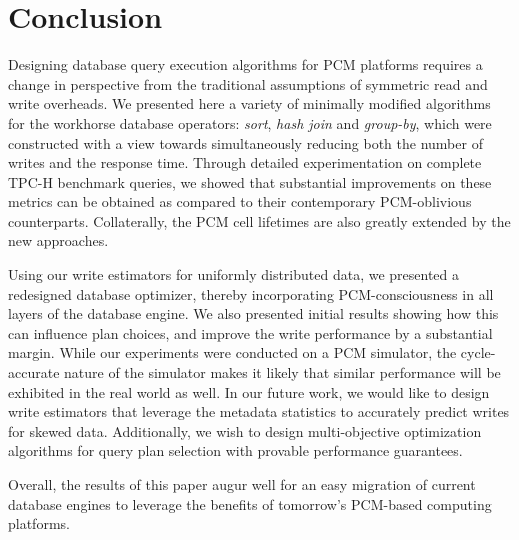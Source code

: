 \section{Conclusion}
\label{conclusion}
Designing database query execution algorithms for PCM platforms requires a
change in perspective from the traditional assumptions of symmetric read
and write overheads.  We presented here a variety of minimally modified algorithms
for the workhorse database operators: \emph{sort}, \emph{hash join} and
\emph{group-by}, which were constructed with a view towards simultaneously
reducing both the number of writes and the response time. Through detailed
experimentation on complete TPC-H benchmark queries, we showed that
substantial improvements on these metrics can be obtained as compared
to their contemporary PCM-oblivious counterparts.  Collaterally, the
PCM cell lifetimes are also greatly extended by the new approaches.

Using our write estimators for uniformly distributed data, we presented
a redesigned database optimizer, thereby incorporating PCM-consciousness
in all layers of the database engine. We also presented initial
results showing how this can influence plan choices, and improve the write
performance by a substantial margin.  While our experiments were conducted
on a PCM simulator, the cycle-accurate nature of the simulator makes it
likely that similar performance will be exhibited in the real world as
well. In our future work, we would like to design write estimators that
leverage the metadata statistics to accurately predict writes for skewed
data. Additionally, we wish to design multi-objective
optimization algorithms for query plan selection with provable performance
guarantees.

Overall, the results of this paper augur well for an easy migration of
current database engines to leverage the benefits of tomorrow's PCM-based
computing platforms.
